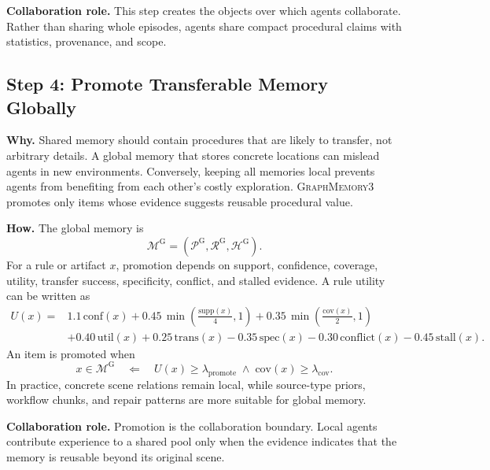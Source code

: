 \documentclass[11pt]{article}
\newcommand{\modelname}{\textsc{GraphMemory3}\xspace}
\newcommand{\globalmem}{\mathcal{M}^{\mathrm{G}}}
\begin{document}
\textbf{Collaboration role.} This step creates the objects over which agents
collaborate. Rather than sharing whole episodes, agents share compact procedural
claims with statistics, provenance, and scope.

\subsection{Step 4: Promote Transferable Memory Globally}

\textbf{Why.} Shared memory should contain procedures that are likely to transfer,
not arbitrary details. A global memory that stores concrete locations can mislead
agents in new environments. Conversely, keeping all memories local prevents agents
from benefiting from each other's costly exploration. \modelname promotes only
items whose evidence suggests reusable procedural value.

\textbf{How.} The global memory is
\begin{equation}
    \globalmem =
    \left(
    \mathcal{P}^{\mathrm{G}},
    \mathcal{R}^{\mathrm{G}},
    \mathcal{H}^{\mathrm{G}}
    \right).
\end{equation}
For a rule or artifact $x$, promotion depends on support, confidence, coverage,
utility, transfer success, specificity, conflict, and stalled evidence. A rule
utility can be written as
\begin{equation}
\begin{aligned}
    U(x) ={}&
    1.1\,\mathrm{conf}(x)
    + 0.45\,\min\!\left(\frac{\mathrm{supp}(x)}{4},1\right)
    + 0.35\,\min\!\left(\frac{\mathrm{cov}(x)}{2},1\right) \\
    &+ 0.40\,\mathrm{util}(x)
    + 0.25\,\mathrm{trans}(x)
    - 0.35\,\mathrm{spec}(x)
    - 0.30\,\mathrm{conflict}(x)
    - 0.45\,\mathrm{stall}(x).
\end{aligned}
\end{equation}
An item is promoted when
\begin{equation}
    x \in \globalmem
    \quad \Longleftarrow \quad
    U(x) \ge \lambda_{\mathrm{promote}}
    \;\wedge\;
    \mathrm{cov}(x) \ge \lambda_{\mathrm{cov}}.
\end{equation}
In practice, concrete scene relations remain local, while source-type priors,
workflow chunks, and repair patterns are more suitable for global memory.

\textbf{Collaboration role.} Promotion is the collaboration boundary. Local agents
contribute experience to a shared pool only when the evidence indicates that the
memory is reusable beyond its original scene.
\end{document}
